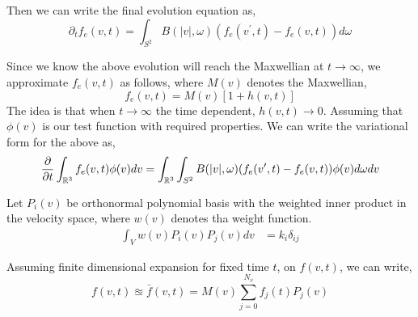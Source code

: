 \documentclass{article}
\begin{document}
Then we can write the final evolution equation as, 
\begin{equation}
    \partial_t f_e(v,t) = \int_{S^2} B(|v|,\omega)(f_e(v^\prime,t) - f_e(v,t)) d\omega
\end{equation}

Since we know the above evolution will reach the Maxwellian at $t\rightarrow \infty$, we approximate $f_e(v,t)$ as follows, where $M(v)$ denotes the Maxwellian, 
\begin{equation}
    f_e(v,t) = M(v)[1 + h(v,t)] \label{eq:maxwelian}
\end{equation}
The idea is that when $t\rightarrow \infty$ the time dependent, $h(v,t)\rightarrow 0$.
Assuming that $\phi(v)$ is our test function with required properties. We can write the variational form for the above as, 
\begin{equation}
    \frac{\partial}{\partial t} \int_{\mathbb{R}^3} f_e(v,t) \phi(v) dv = \int_{\mathbb{R}^3} \int_{S^2} B(|v|,\omega)(f_e(v^\prime,t) - f_e(v,t)) \phi(v) d\omega dv \label{eq:0d_wf}
\end{equation}

Let $P_i(v)$ be orthonormal polynomial basis with the weighted inner product in the velocity space, where $w(v)$ denotes tha weight function. 
\begin{align}
    \int_{V} w(v)P_i(v)P_j(v) dv &= k_i\delta_{ij}
\end{align}

Assuming finite dimensional expansion for fixed time $t$, on $f(v,t)$, we can write, 
\begin{equation}
    f(v,t) \approxeq \bar{f}(v,t) = M(v)\sum_{j=0}^{N_v} f_j(t) P_j(v) \label{eq:basis_expansion}
\end{equation}
\end{document}
